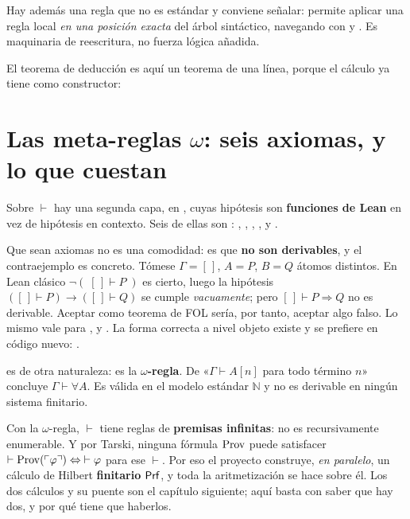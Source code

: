 Hay además una regla que no es estándar y conviene señalar:  permite aplicar una
regla local \emph{en una posición exacta} del árbol sintáctico, navegando con  y
. Es maquinaria de reescritura, no fuerza lógica añadida.

El teorema de deducción es aquí un teorema de una línea, porque el cálculo ya tiene
 como constructor:


\section{Las meta-reglas \texorpdfstring{$\omega$}{omega}: seis axiomas, y lo que cuestan}

Sobre \(\vdash\) hay una segunda capa, en , cuyas hipótesis son
\textbf{funciones de Lean} en vez de hipótesis en contexto. Seis de ellas son :
, , , ,  y .


Que sean axiomas no es una comodidad: es que \textbf{no son derivables}, y el contraejemplo es
concreto. Tómese \(\Gamma = [\,]\), \(A = P\), \(B = Q\) átomos distintos. En Lean clásico
\(\lnot(\;[\,] \vdash P\;)\) es cierto, luego la hipótesis \(([\,]\vdash P) \to ([\,]\vdash Q)\) se
cumple \emph{vacuamente}; pero \([\,] \vdash P \Rightarrow Q\) no es derivable. Aceptar
 como teorema de FOL sería, por tanto, aceptar algo falso. Lo mismo vale para
,  y . La forma correcta a nivel objeto existe y se
prefiere en código nuevo: .

 es de otra naturaleza: es la \textbf{\(\omega\)-regla}. De «\(\Gamma \vdash A[n]\) para
todo término \(n\)» concluye \(\Gamma \vdash \forall A\). Es válida en el modelo estándar
\(\mathbb{N}\) y no es derivable en ningún sistema finitario.

\begin{muro}
Con la \(\omega\)-regla, \(\vdash\) tiene reglas de \textbf{premisas infinitas}: no es recursivamente
enumerable. Y por Tarski, ninguna fórmula \(\operatorname{Prov}\) puede satisfacer
\(\vdash \operatorname{Prov}(\ulcorner \varphi \urcorner) \Leftrightarrow \;\vdash \varphi\) para ese \(\vdash\).
Por eso el proyecto construye, \emph{en paralelo}, un cálculo de Hilbert \textbf{finitario}
\(\mathsf{Prf}\), y toda la aritmetización se hace sobre él. Los dos cálculos y su puente son el capítulo siguiente;
aquí basta con saber que hay dos, y por qué tiene que haberlos.
\end{muro}

